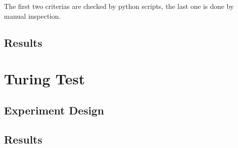 The first two criterias are checked by python scripts, the last one is done by manual inspection.


\subsection{Results}
\section{Turing Test}
\subsection{Experiment Design}

\subsection{Results}
